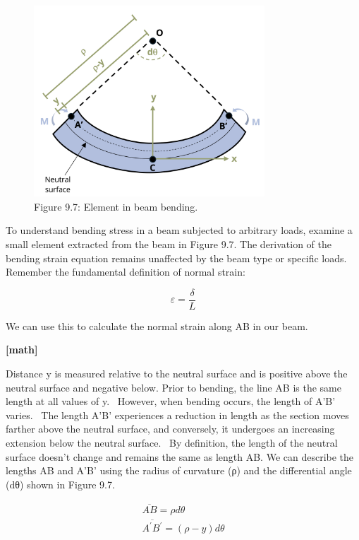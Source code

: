 \documentclass[
  letterpaper,
  DIV=11,
  numbers=noendperiod]{scrreprt}
\begin{document}
\begin{figure}[H]

{\centering \includegraphics[width=3.40625in,height=\textheight]{images/CH9 PNGs/Figure 9.7.png}

}

\caption{Figure 9.7: Element in beam bending.}

\end{figure}%

To understand bending stress in a beam subjected to arbitrary loads,
examine a small element extracted from the beam in Figure 9.7. The
derivation of the bending strain equation remains unaffected by the beam
type or specific loads. Remember the fundamental definition of normal
strain:

\[
\varepsilon=\frac{\delta}{L}
\]

We can use this to calculate the normal strain along AB in our beam.

\textbf{{[}math{]}}

Distance y is measured relative to the neutral surface and is positive
above the neutral surface and negative below. Prior to bending, the line
AB is the same length at all values of y.~ However, when bending occurs,
the length of A'B' varies.~ The length A'B' experiences a reduction in
length as the section moves farther above the neutral surface, and
conversely, it undergoes an increasing extension below the neutral
surface.~ By definition, the length of the neutral surface doesn't
change and remains the same as length AB. We can describe the lengths AB
and A'B' using the radius of curvature (ρ) and the differential angle
(dθ) shown in Figure 9.7.

\[
\begin{gathered}
\overline{A B}=\rho d \theta \\
\overline{A^{\prime} B^{\prime}}=(\rho-y) d \theta
\end{gathered}
\]
\end{document}
